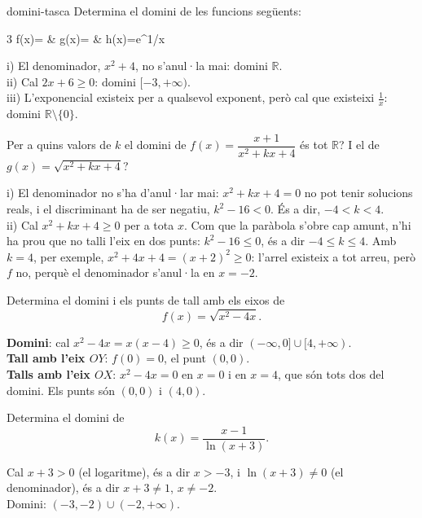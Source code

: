 \begin{apartats}

\begin{tria}{domini-tasca}
Determina el domini de les funcions següents:
\begin{graella}{3}
  \sa f(x)= & \sa g(x)= & \sa h(x)=e^{1/x}
\end{graella}

\begin{solucio}
i) El denominador, $x^2+4$, no s'anul·la mai: domini $\mathbb{R}$.\\
ii) Cal $2x+6\ge0$: domini $[-3,+\infty)$.\\
iii) L'exponencial existeix per a qualsevol exponent, però cal que existeixi $\frac1x$: domini
$\mathbb{R}\setminus\{0\}$.
\end{solucio}

Per a quins valors de $k$ el domini de $f(x)=\dfrac{x+1}{x^2+kx+4}$ és tot $\mathbb{R}$? I el de
$g(x)=\sqrt{x^2+kx+4}$?

\begin{solucio}
i) El denominador no s'ha d'anul·lar mai: $x^2+kx+4=0$ no pot tenir solucions reals, i el
discriminant ha de ser negatiu, $k^2-16<0$. És a dir, $-4<k<4$.\\
ii) Cal $x^2+kx+4\ge0$ per a tota $x$. Com que la paràbola s'obre cap amunt, n'hi ha prou que no
talli l'eix en dos punts: $k^2-16\le0$, és a dir $-4\le k\le4$. Amb $k=4$, per exemple,
$x^2+4x+4=(x+2)^2\ge0$: l'arrel existeix a tot arreu, però $f$ no, perquè el denominador s'anul·la
en $x=-2$.
\end{solucio}
\end{tria}

Determina el domini i els punts de tall amb els eixos de
\[
f(x)=\sqrt{x^2-4x} .
\]

\begin{solucio}
\textbf{Domini}: cal $x^2-4x=x(x-4)\ge0$, és a dir $(-\infty,0]\cup[4,+\infty)$.\\
\textbf{Tall amb l'eix $OY$}: $f(0)=0$, el punt $(0,0)$.\\
\textbf{Talls amb l'eix $OX$}: $x^2-4x=0$ en $x=0$ i en $x=4$, que són tots dos del domini. Els punts
són $(0,0)$ i $(4,0)$.
\end{solucio}

\begin{nomesllarg}
Determina el domini de
\[
k(x)=\frac{x-1}{\ln(x+3)} .
\]

\begin{solucio}
Cal $x+3>0$ (el logaritme), és a dir $x>-3$, i $\ln(x+3)\neq0$ (el denominador), és a dir $x+3\neq1$,
$x\neq-2$.\\
Domini: $(-3,-2)\cup(-2,+\infty)$.
\end{solucio}
\end{nomesllarg}

\end{apartats}
